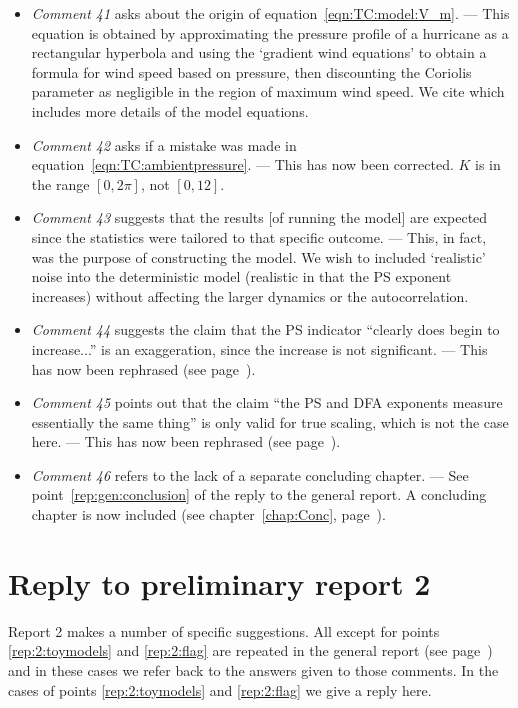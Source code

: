 \begin{itemize}
	\item \emph{Comment 41} asks about the origin of equation~\ref{eqn:TC:model:V_m}. — This equation is obtained by approximating the pressure profile of a hurricane as a rectangular hyperbola and using the `gradient wind equations' to obtain a formula for wind speed based on pressure, then discounting the Coriolis parameter as negligible in the region of maximum wind speed. We cite \cite{holland1980} which includes more details of the model equations. 
	\item \emph{Comment 42} asks if a mistake was made in equation~\ref{eqn:TC:ambientpressure}. — This has now been corrected. $K$ is in the range $[0,2\pi]$, not $[0,12]$.
	\item \emph{Comment 43} suggests that the results [of running the model] are expected since the statistics were tailored to that specific outcome. — This, in fact, was the purpose of constructing the model. We wish to included `realistic' noise into the deterministic model (realistic in that the PS exponent increases) without affecting the larger dynamics or the autocorrelation. 
	\item \emph{Comment 44} suggests the claim that the PS indicator ``clearly does begin to increase...'' is an exaggeration, since the increase is not significant. — This has now been rephrased (see page~\pageref{pageref:TC:exaggeration}).
	\item \emph{Comment 45} points out that the claim ``the PS and DFA exponents measure essentially the same thing'' is only valid for true scaling, which is not the case here. — This has now been rephrased (see page~\pageref{pageref:TC:scaling_comment}).
	\item \emph{Comment 46} refers to the lack of a separate concluding chapter. — See point~\ref{rep:gen:conclusion} of the reply to the general report. A concluding chapter is now included (see chapter~\ref{chap:Conc}, page~\pageref{chap:Conc}). 
\end{itemize}



\section*{Reply to preliminary report 2}
\label{rep:2}

Report 2 makes a number of specific suggestions. All except for points \ref{rep:2:toymodels} and \ref{rep:2:flag} are repeated in the general report (see page~\pageref{rep:gen}) and in these cases we refer back to the answers given to those comments. In the cases of points \ref{rep:2:toymodels} and \ref{rep:2:flag} we give a reply here. 

